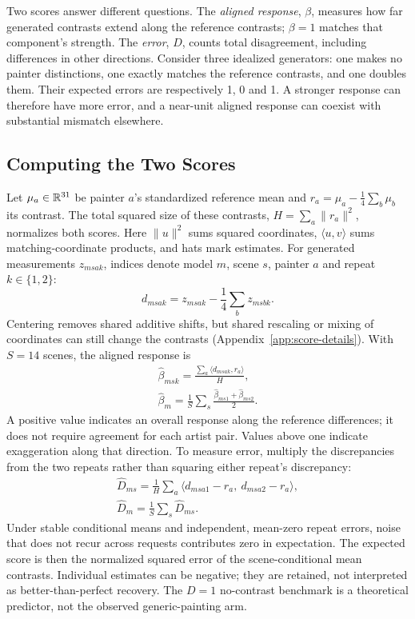Two scores answer different questions. The \emph{aligned response}, $\beta$,
measures how far generated contrasts extend along the reference contrasts;
$\beta=1$ matches that component's strength. The \emph{error}, $D$, counts total
disagreement, including differences in other directions. Consider three idealized
generators: one makes no painter distinctions, one exactly matches the reference
contrasts, and one doubles them. Their expected errors are respectively 1, 0
and 1. A stronger response can therefore have more error, and a near-unit
aligned response can coexist with substantial mismatch elsewhere.

\subsection{Computing the Two Scores}
Let $\mu_a\in\mathbb R^{31}$ be painter $a$'s standardized reference mean and
$r_a=\mu_a-\frac14\sum_b\mu_b$ its contrast. The total squared size of these
contrasts, $H=\sum_a\|r_a\|^2$, normalizes both scores. Here $\|u\|^2$ sums squared
coordinates, $\langle u,v\rangle$ sums matching-coordinate products, and
hats mark estimates. For generated measurements $z_{msak}$, indices denote
model $m$, scene $s$, painter $a$ and repeat $k\in\{1,2\}$:
\begin{equation}
 d_{msak}=z_{msak}-\frac14\sum_b z_{msbk}.
 \label{eq:center}
\end{equation}
Centering removes shared additive shifts, but shared rescaling or mixing
of coordinates can still change the contrasts
(Appendix~\ref{app:score-details}). With $S=14$ scenes, the aligned response is
\begin{equation}
\begin{gathered}
\widehat\beta_{msk}=\frac{\sum_a\langle d_{msak},r_a\rangle}{H},\\
\widehat\beta_m=\frac1S\sum_s\frac{\widehat\beta_{ms1}+\widehat\beta_{ms2}}2.
\end{gathered}
\label{eq:beta}
\end{equation}
A positive value indicates an overall response along the reference differences;
it does not require agreement for each artist pair. Values above one indicate
exaggeration along that direction. To measure error, multiply the discrepancies
from the two repeats rather than squaring either repeat's discrepancy:
\begin{equation}
\begin{gathered}
\widehat D_{ms}=\frac1H\sum_a
\langle d_{msa1}-r_a,\ d_{msa2}-r_a\rangle,\\
\widehat D_m=\frac1S\sum_s\widehat D_{ms}.
\end{gathered}
\label{eq:distortion}
\end{equation}
Under stable conditional means and independent, mean-zero repeat errors,
noise that does not recur across requests contributes zero in expectation.
The expected score is then the normalized squared error of the scene-conditional
mean contrasts. Individual estimates can be negative; they are retained, not
interpreted as better-than-perfect recovery. The $D=1$ no-contrast benchmark
is a theoretical predictor, not the observed generic-painting arm.

